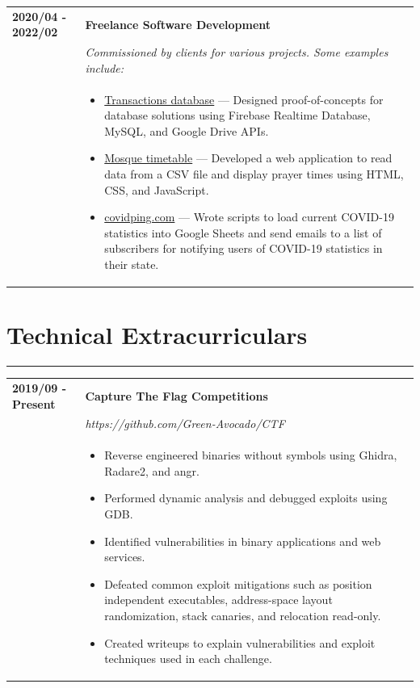 \documentclass[letterpaper]{article}
\newcommand{\sectcolor}{cyan}
\newcommand{\sect}[1]{\section*{#1}
                        {\color{\sectcolor}
                        \rule{\textwidth}{1pt}
                        \vspace{-1ex}}}
\begin{document}
        \begin{tabular}{p{} p{}}
            \textbf{2020/04 - 2022/02} & \textbf{Freelance Software Development} \\
            & \emph{Commissioned by clients for various projects. Some examples include:} \\
            & \begin{itemize}
                \item \underline{Transactions database} ---
                    Designed proof-of-concepts for database solutions using Firebase Realtime Database,
                    MySQL, and Google Drive APIs.
                \item \underline{Mosque timetable} ---
                    Developed a web application to read data from a CSV file and display prayer times
                    using HTML, CSS, and JavaScript.
                \item \underline{covidping.com} ---
                    Wrote scripts to load current COVID-19 statistics into Google Sheets and send emails
                    to a list of subscribers for notifying users of COVID-19 statistics in their state.
            \end{itemize}
        \end{tabular}

    \sect{Technical Extracurriculars}

        \begin{tabular}{p{} p{}}
            \textbf{2019/09 - Present} & \textbf{Capture The Flag Competitions} \\
            & \emph{https://github.com/Green-Avocado/CTF} \\
            & \begin{itemize}
                \item Reverse engineered binaries without symbols using Ghidra, Radare2, and angr.
                \item Performed dynamic analysis and debugged exploits using GDB.
                \item Identified vulnerabilities in binary applications and web services.
                \item Defeated common exploit mitigations such as position independent executables,
                    address-space layout randomization, stack canaries, and relocation read-only.
                \item Created writeups to explain vulnerabilities and exploit techniques used in each
                    challenge.
            \end{itemize}
        \end{tabular}
\end{document}

